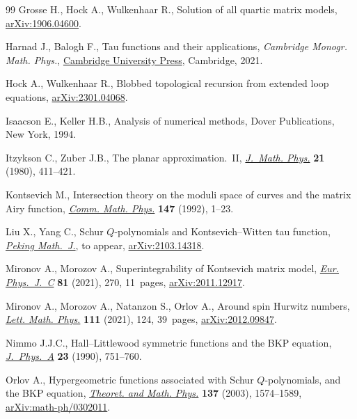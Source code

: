 \documentclass[10pt,a4paper]{amsart}
\numberwithin{equation}{section}
\begin{document}
\begin{thebibliography}{99}
Grosse H., Hock A., Wulkenhaar R., Solution of all quartic matrix models,
 \href{https://arxiv.org/abs/1906.04600}{arXiv:1906.04600}.

Harnad J., Balogh F., Tau functions and their applications, \textit{Cambridge Monogr. Math. Phys.}, \href{https://doi.org/10.1017/9781108610902}{Cambridge University Press}, Cambridge, 2021.

Hock A., Wulkenhaar R., Blobbed topological recursion from extended loop
 equations, \href{https://arxiv.org/abs/2301.04068}{arXiv:2301.04068}.

Isaacson E., Keller H.B., Analysis of numerical methods, Dover Publications,
 New York, 1994.

Itzykson C., Zuber J.B., The planar approximation.~{II}, \href{https://doi.org/10.1063/1.524438}{\textit{J.~Math.
 Phys.}} \textbf{21} (1980), 411--421.

Kontsevich M., Intersection theory on the moduli space of curves and the matrix
 {A}iry function, \href{https://doi.org/10.1007/BF02099526}{\textit{Comm. Math. Phys.}} \textbf{147} (1992), 1--23.

Liu X., Yang C., Schur ${Q}$-polynomials and {K}ontsevich--{W}itten tau
 function, \href{https://doi.org/10.1007/s42543-023-00064-6}{\textit{Peking Math.~J.}}, {t}o appear, \href{https://arxiv.org/abs/2103.14318}{arXiv:2103.14318}.

Mironov A., Morozov A., Superintegrability of {K}ontsevich matrix model,
 \href{https://doi.org/10.1140/epjc/s10052-021-09030-x}{\textit{Eur. Phys.~J.~C}} \textbf{81} (2021), 270, 11~pages,
 \href{https://arxiv.org/abs/2011.12917}{arXiv:2011.12917}.

Mironov A., Morozov A., Natanzon S., Orlov A., Around spin {H}urwitz numbers,
 \href{https://doi.org/10.1007/s11005-021-01457-3}{\textit{Lett. Math. Phys.}} \textbf{111} (2021), 124, 39~pages,
 \href{https://arxiv.org/abs/2012.09847}{arXiv:2012.09847}.

Nimmo J.J.C., Hall--{L}ittlewood symmetric functions and the {BKP} equation,
 \href{https://doi.org/10.1088/0305-4470/23/5/018}{\textit{J.~Phys.~A}} \textbf{23} (1990), 751--760.

Orlov A., Hypergeometric functions associated with {S}chur {$Q$}-polynomials,
 and the {BKP} equation, \href{https://doi.org/10.1023/A:1027370004436}{\textit{Theoret. and Math. Phys.}} \textbf{137}
 (2003), 1574--1589, \href{https://arxiv.org/abs/math-ph/0302011}{arXiv:math-ph/0302011}.


\end{thebibliography}
\end{document}
